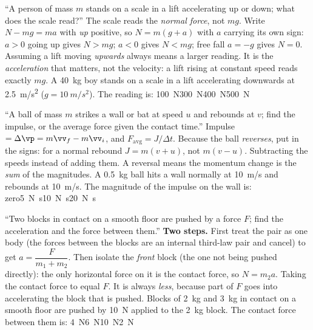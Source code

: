 {``A person of mass $m$ stands on a scale in a lift accelerating up or down; what does the scale
read?''}
{The scale reads the \emph{normal force}, not $mg$. Write $N-mg=ma$ with \emph{up} positive, so
$N=m(g+a)$ with $a$ carrying its own sign: $a>0$ going up gives $N>mg$; $a<0$ gives $N<mg$; free fall
$a=-g$ gives $N=0$.}
{Assuming a lift moving \emph{upwards} always means a larger reading. It is the \emph{acceleration}
that matters, not the velocity: a lift rising at constant speed reads exactly $mg$.}
{A \SI{40}{kg} boy stands on a scale in a lift accelerating downwards at \SI{2.5}{m/s^2}
($g=\SI{10}{m/s^2}$). The reading is:}
{\SI{100}{N}}{\SI{300}{N}}{\SI{400}{N}}{\SI{500}{N}}

{``A ball of mass $m$ strikes a wall or bat at speed $u$ and rebounds at $v$; find the impulse, or the
average force given the contact time.''}
{Impulse $=\Delta\vp=m\vv_f-m\vv_i$, and $F_{\text{avg}}=J/\Delta t$. Because the ball \emph{reverses}, put in
the signs: for a normal rebound $J=m(v+u)$, not $m(v-u)$.}
{Subtracting the speeds instead of adding them. A reversal means the momentum change is the
\emph{sum} of the magnitudes.}
{A \SI{0.5}{kg} ball hits a wall normally at \SI{10}{m/s} and rebounds at \SI{10}{m/s}. The magnitude of
the impulse on the wall is:}
{zero}{\SI{5}{N.s}}{\SI{10}{N.s}}{\SI{20}{N.s}}

{``Two blocks in contact on a smooth floor are pushed by a force $F$; find the acceleration and the
force between them.''}
{\textbf{Two steps.} First treat the pair as one body (the forces between the blocks are an internal
third-law pair and cancel) to get $a=\dfrac{F}{m_1+m_2}$. Then isolate the
\emph{front} block (the one not being pushed directly): the only horizontal force on it is the contact
force, so $N=m_2a$.}
{Taking the contact force to equal $F$. It is always \emph{less}, because part of $F$ goes into
accelerating the block that is pushed.}
{Blocks of \SI{2}{kg} and \SI{3}{kg} in contact on a smooth floor are pushed by \SI{10}{N} applied to the
\SI{2}{kg} block. The contact force between them is:}
{\SI{4}{N}}{\SI{6}{N}}{\SI{10}{N}}{\SI{2}{N}}

